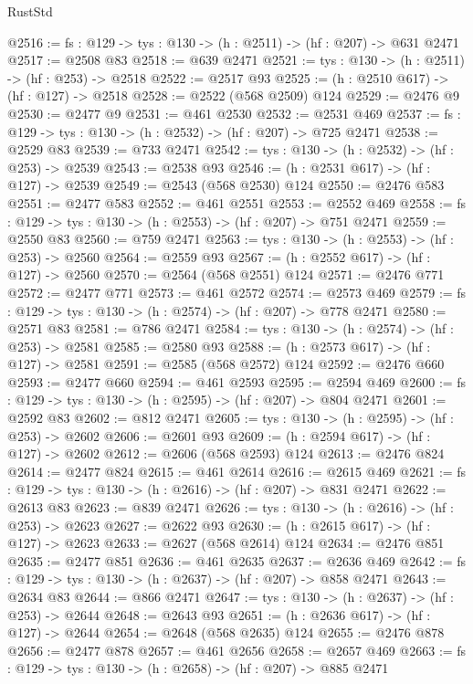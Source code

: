 \begin{lexlean}{RustStd}
\begin{coremodule}
{\begin{coremodule}
{{{{{{{{{{{{{{{@2516 := {fs : @129} -> {tys : @130} -> (h : @2511) -> (hf : @207) -> @631 @2471
@2517 := @2508 @83
@2518 := @639 @2471
@2521 := {tys : @130} -> (h : @2511) -> (hf : @253) -> @2518
@2522 := @2517 @93
@2525 := (h : @2510 @617) -> (hf : @127) -> @2518
@2528 := @2522 (@568 @2509) @124
@2529 := @2476 @9
@2530 := @2477 @9
@2531 := @461 @2530
@2532 := @2531 @469
@2537 := {fs : @129} -> {tys : @130} -> (h : @2532) -> (hf : @207) -> @725 @2471
@2538 := @2529 @83
@2539 := @733 @2471
@2542 := {tys : @130} -> (h : @2532) -> (hf : @253) -> @2539
@2543 := @2538 @93
@2546 := (h : @2531 @617) -> (hf : @127) -> @2539
@2549 := @2543 (@568 @2530) @124
@2550 := @2476 @583
@2551 := @2477 @583
@2552 := @461 @2551
@2553 := @2552 @469
@2558 := {fs : @129} -> {tys : @130} -> (h : @2553) -> (hf : @207) -> @751 @2471
@2559 := @2550 @83
@2560 := @759 @2471
@2563 := {tys : @130} -> (h : @2553) -> (hf : @253) -> @2560
@2564 := @2559 @93
@2567 := (h : @2552 @617) -> (hf : @127) -> @2560
@2570 := @2564 (@568 @2551) @124
@2571 := @2476 @771
@2572 := @2477 @771
@2573 := @461 @2572
@2574 := @2573 @469
@2579 := {fs : @129} -> {tys : @130} -> (h : @2574) -> (hf : @207) -> @778 @2471
@2580 := @2571 @83
@2581 := @786 @2471
@2584 := {tys : @130} -> (h : @2574) -> (hf : @253) -> @2581
@2585 := @2580 @93
@2588 := (h : @2573 @617) -> (hf : @127) -> @2581
@2591 := @2585 (@568 @2572) @124
@2592 := @2476 @660
@2593 := @2477 @660
@2594 := @461 @2593
@2595 := @2594 @469
@2600 := {fs : @129} -> {tys : @130} -> (h : @2595) -> (hf : @207) -> @804 @2471
@2601 := @2592 @83
@2602 := @812 @2471
@2605 := {tys : @130} -> (h : @2595) -> (hf : @253) -> @2602
@2606 := @2601 @93
@2609 := (h : @2594 @617) -> (hf : @127) -> @2602
@2612 := @2606 (@568 @2593) @124
@2613 := @2476 @824
@2614 := @2477 @824
@2615 := @461 @2614
@2616 := @2615 @469
@2621 := {fs : @129} -> {tys : @130} -> (h : @2616) -> (hf : @207) -> @831 @2471
@2622 := @2613 @83
@2623 := @839 @2471
@2626 := {tys : @130} -> (h : @2616) -> (hf : @253) -> @2623
@2627 := @2622 @93
@2630 := (h : @2615 @617) -> (hf : @127) -> @2623
@2633 := @2627 (@568 @2614) @124
@2634 := @2476 @851
@2635 := @2477 @851
@2636 := @461 @2635
@2637 := @2636 @469
@2642 := {fs : @129} -> {tys : @130} -> (h : @2637) -> (hf : @207) -> @858 @2471
@2643 := @2634 @83
@2644 := @866 @2471
@2647 := {tys : @130} -> (h : @2637) -> (hf : @253) -> @2644
@2648 := @2643 @93
@2651 := (h : @2636 @617) -> (hf : @127) -> @2644
@2654 := @2648 (@568 @2635) @124
@2655 := @2476 @878
@2656 := @2477 @878
@2657 := @461 @2656
@2658 := @2657 @469
@2663 := {fs : @129} -> {tys : @130} -> (h : @2658) -> (hf : @207) -> @885 @2471
}}}}}}}}}}}}}}}
\end{coremodule}}
\end{coremodule}
\end{lexlean}
